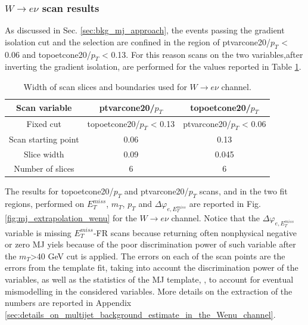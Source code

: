 \subsubsection{$W\rightarrow e\nu$ scan results}
\label{sec:bkg_mj_we_scan}

As discussed in Sec. \ref{sec:bkg_mj_approach}, the events passing the gradient isolation cut and the selection are confined in the region of ptvarcone20/$p_T$ < 0.06 and topoetcone20/$p_T$ < 0.13. 
For this reason scans on the two variables,after inverting the gradient isolation, are performed for the values reported in Table \ref{tbl:mj_scan_binning_el}.

\begin{table}[htbp]
\small
\begin{center}
 \begin{tabular}{ | c | c | c | } 
 \hline
 Scan variable & ptvarcone20/$p_T$ & topoetcone20/$p_T$ \\
 \hline 
 Fixed cut & topoetcone20/$p_T$ < 0.13 & ptvarcone20/$p_T$ < 0.06 \\
 \hline 
 Scan starting point & 0.06 & 0.13 \\
 Slice width & 0.09 & 0.045 \\
 Number of slices & 6 & 6 \\
 \hline 
\end{tabular}
\caption{
Width of scan slices and boundaries used for $W\rightarrow e\nu$ channel.
}%
\label{tbl:mj_scan_binning_el}
\end{center}
\end{table}

The results for topoetcone20/$p_T$ and ptvarcone20/$p_T$ scans, and in the two fit regions, performed on $E_T^{miss}$, $m_T$, $p_T$ and $\Delta\varphi_{e,E_T^{miss}}$ are reported in Fig.\ref{fig:mj_extrapolation_wenu} for the $W\rightarrow e\nu$ channel.
Notice that the $\Delta\varphi_{e,E_T^{miss}}$ variable is missing $E_T^{miss}$-FR scans because returning often nonphysical negative or zero MJ yiels because of the poor discrimination power of such variable after the $m_T$>40 GeV cut is applied.
The errors on each of the scan points are the errors from the template fit, taking into account the discrimination power of the variables, as well as the statistics of the MJ template, , to account for eventual mismodelling in the considered variables.
More details on the extraction of the numbers are reported in Appendix \ref{sec:details_on_multijet_background_estimate_in_the_Wenu_channel}.

